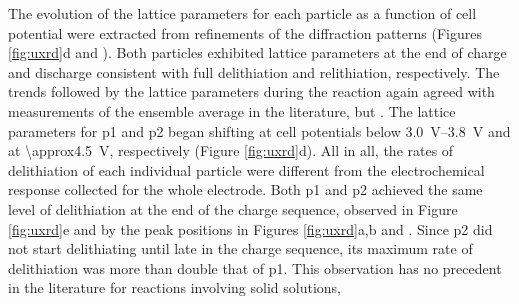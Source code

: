 \documentclass{article}
\begin{document}
The evolution of the lattice parameters for each particle as a
function of cell potential were extracted from refinements of the
diffraction patterns (Figures \ref{fig:uxrd}d and
). Both particles exhibited lattice parameters
at the end of charge and discharge consistent with full delithiation
and relithiation, respectively\cite{novak2015}. The trends followed by
the lattice parameters during the reaction again agreed with
measurements of the ensemble average in the
literature\cite{novak2015}, but . The lattice parameters for
\gls{p1} and \gls{p2} began shifting at cell potentials below
\SIrange{3.0}{3.8}{\volt} and at \SI{\approx4.5}{\volt}, respectively
(Figure \ref{fig:uxrd}d). All in all, the rates of delithiation of
each individual particle were different from the electrochemical
response collected for the whole electrode. Both \gls{p1} and \gls{p2}
achieved the same level of delithiation at the end of the charge
sequence, observed in Figure \ref{fig:uxrd}e and by the peak positions
in Figures \ref{fig:uxrd}a,b and . Since
\gls{p2} did not start delithiating until late in the charge sequence,
its maximum rate of delithiation was more than double that of
\gls{p1}. This observation has no precedent in the literature for
reactions involving solid solutions, 

\end{document}
